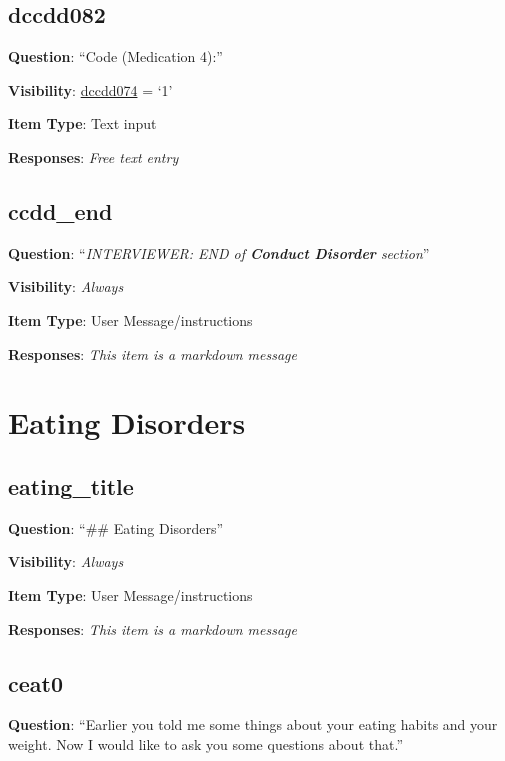 \documentclass[]{book}
\begin{document}
\hypertarget{dccdd082}{%
\section{dccdd082}\label{dccdd082}}

\textbf{Question}: ``Code (Medication 4):''

\textbf{Visibility}: \protect\hyperlink{dccdd074}{dccdd074} = `1'

\textbf{Item Type}: Text input

\textbf{Responses}: \emph{Free text entry}

\hypertarget{ccdd_end}{%
\section{ccdd\_end}\label{ccdd_end}}

\textbf{Question}: ``\emph{INTERVIEWER: END of \textbf{Conduct Disorder} section}''

\textbf{Visibility}: \emph{Always}

\textbf{Item Type}: User Message/instructions

\textbf{Responses}: \emph{This item is a markdown message}

\hypertarget{eating_disorders_section}{%
\chapter{Eating Disorders}\label{eating_disorders_section}}

\hypertarget{eating_title}{%
\section{eating\_title}\label{eating_title}}

\textbf{Question}: ``\#\# Eating Disorders''

\textbf{Visibility}: \emph{Always}

\textbf{Item Type}: User Message/instructions

\textbf{Responses}: \emph{This item is a markdown message}

\hypertarget{ceat0}{%
\section{ceat0}\label{ceat0}}

\textbf{Question}: ``Earlier you told me some things about your eating habits and your weight. Now I would like to ask you some questions about that.''
\end{document}
